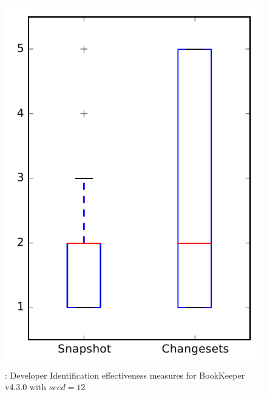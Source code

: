 
\begin{figure}
\centering
\includegraphics[height=0.4\textheight]{figures/dit_seed/rq1_bookkeeper_12}
\caption{\rtwo: Developer Identification effectiveness measures for BookKeeper v4.3.0 with $seed=12$}
\label{fig:dit_seed:rq1:bookkeeper}
\end{figure}
